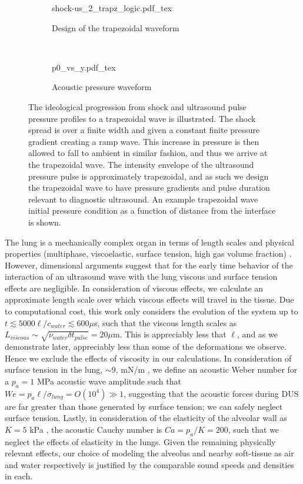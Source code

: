 \documentclass{jfm}%
\newcommand{\orderof}[1]{\ensuremath{\textit{O}\left(#1\right)}}
\begin{document}
\begin{figure}%
  \centering%
  \begin{subfigure}[b]{\textwidth}
    \centering
    \def\svgwidth{0.8\textwidth}%
    {shock-us_2_trapz_logic.pdf_tex}%
    \caption{\label{fig:wave_logic} Design of the trapezoidal waveform}
  \end{subfigure}
  ~
  \begin{subfigure}[b]{0.5\textwidth}
    \centering
    \def\svgwidth{\textwidth}
    {p0_vs_y.pdf_tex}%
    \caption{\label{fig:p0_vs_y}Acoustic pressure waveform}
  \end{subfigure}
  \caption[Trapezoidal wave]{\protect{} The
    ideological progression from shock and ultrasound pulse pressure
    profiles to a trapezoidal wave is illustrated. The shock spread is
    over a finite width and given a constant finite pressure gradient
    creating a ramp wave. This increase in pressure is then allowed to
    fall to ambient in similar fashion, and thus we arrive at the
    trapezoidal wave. The intensity envelope of the ultrasound
    pressure pulse is approximately trapezoidal, and as such we design
    the trapezoidal wave to have pressure gradients and pulse duration
    relevant to diagnostic ultrasound. \protect{} An
    example trapezoidal wave initial pressure condition as a function
    of distance from the interface is shown.}%
  \label{fig:p0}
\end{figure}

The lung is a mechanically complex organ in terms of length scales and
physical properties (multiphase, viscoelastic, surface tension, high
gas volume fraction) \citep{Bayliss1939, Suki1994}. However,
dimensional arguments suggest that for the early time behavior of the
interaction of an ultrasound wave with the lung viscous and surface
tension effects are negligible. In consideration of viscous effects,
we calculate an approximate length scale over which viscous effects
will travel in the tissue. Due to computational cost, this work only
considers the evolution of the system up to
$t\lesssim 5000 \ell/c_{water}\lesssim 600 \mu$s, such that the viscous
length scales as
$L_{viscous}\sim\sqrt{\nu_{water} \delta t_{pulse}}=20 \mu$m. This is
appreciably less that $\ell$, and as we demonstrate later, appreciably
less than some of the deformations we observe. Hence we exclude the
effects of viscosity in our calculations. In consideration of surface
tension in the lung, $\sim9$, mN/m \citep{Schurch1976}, we define an
acoustic Weber number for a $p_a=1$ MPa acoustic wave amplitude such
that $We=p_a\ell/\sigma_{lung}=\orderof{10^4}\gg1$, suggesting that
the acoustic forces during \ac{DUS} are far greater than those
generated by surface tension; we can safely neglect surface
tension. Lastly, in consideration of the elasticity of the alveolar
wall as $K = 5$ kPa \cite{Cavalcante2005}, the acoustic Cauchy number
is $Ca=p_a/K=200$, such that we neglect the effects of elasticity in
the lungs. Given the remaining physically relevant effects, our choice
of modeling the alveolus and nearby soft-tissue as air and water
respectively is justified by the comparable sound speeds and densities
in each.
% 
\end{document}
